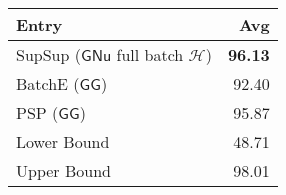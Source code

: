 \begin{tabular}{lr}
\toprule
                                                         Entry &   Avg \\
\midrule
 SupSup ($\ensuremath{\mathsf{GNu}}$ full batch $\mathcal{H}$) & \textbf{96.13} \\
                           BatchE ($\ensuremath{\mathsf{GG}}$) & 92.40 \\
                              PSP ($\ensuremath{\mathsf{GG}}$) & 95.87 \\
                                                   Lower Bound & 48.71 \\\midrule
                                                   Upper Bound & 98.01 \\
\bottomrule
\end{tabular}
